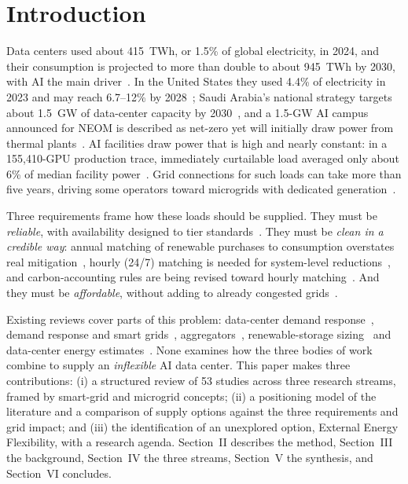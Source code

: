 \documentclass[conference]{IEEEtran}
\begin{document}
\section{Introduction}
Data centers used about 415~TWh, or 1.5\% of global electricity, in 2024, and their consumption is projected to more than double to about 945~TWh by 2030, with AI the main driver~\cite{r40}. In the United States they used 4.4\% of electricity in 2023 and may reach 6.7--12\% by 2028~\cite{r1}; Saudi Arabia's national strategy targets about 1.5~GW of data-center capacity by 2030~\cite{r52}, and a 1.5-GW AI campus announced for NEOM is described as net-zero yet will initially draw power from thermal plants~\cite{r53}. AI facilities draw power that is high and nearly constant: in a 155{,}410-GPU production trace, immediately curtailable load averaged only about 6\% of median facility power~\cite{r26}. Grid connections for such loads can take more than five years, driving some operators toward microgrids with dedicated generation~\cite{r28}.

Three requirements frame how these loads should be supplied. They must be \emph{reliable}, with availability designed to tier standards~\cite{r41}. They must be \emph{clean in a credible way}: annual matching of renewable purchases to consumption overstates real mitigation~\cite{r12}, hourly (24/7) matching is needed for system-level reductions~\cite{r10,r11}, and carbon-accounting rules are being revised toward hourly matching~\cite{r50}. And they must be \emph{affordable}, without adding to already congested grids~\cite{r27,r28}.

Existing reviews cover parts of this problem: data-center demand response~\cite{r3}, demand response and smart grids~\cite{r17,r57}, aggregators~\cite{r59}, renewable-storage sizing~\cite{r30} and data-center energy estimates~\cite{r29}. None examines how the three bodies of work combine to supply an \emph{inflexible} AI data center. This paper makes three contributions: (i) a structured review of 53 studies across three research streams, framed by smart-grid and microgrid concepts; (ii) a positioning model of the literature and a comparison of supply options against the three requirements and grid impact; and (iii) the identification of an unexplored option, External Energy Flexibility, with a research agenda. Section~II describes the method, Section~III the background, Section~IV the three streams, Section~V the synthesis, and Section~VI concludes.
\end{document}
